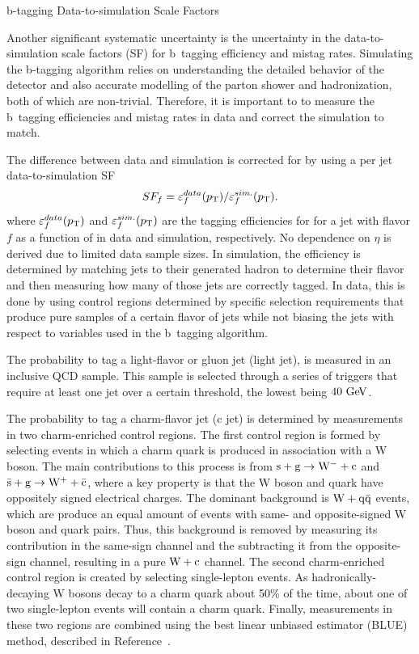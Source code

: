 \begin{section}{b-tagging Data-to-simulation Scale Factors}

Another significant systematic uncertainty is the uncertainty in the data-to-simulation scale factors (SF) for b~tagging efficiency and mistag rates.
Simulating the b-tagging algorithm relies on understanding the detailed behavior of the detector and also accurate modelling of the parton shower and hadronization, both of which are non-trivial.
Therefore, it is important to to measure the b~tagging efficiencies and mistag rates in data and correct the simulation to match.

The difference between data and simulation is corrected for by using a per jet data-to-simulation SF
\begin{align}
SF_{f} = \varepsilon^{data}_{f}(p_{\mathrm{T}})/\varepsilon^{sim.}_{f}(p_{\mathrm{T}}).
\end{align}
where $\varepsilon^{data}_{f}(p_{\mathrm{T}})$ and $\varepsilon^{sim.}_{f}(p_{\mathrm{T}})$ are the tagging efficiencies for for a jet with flavor $f$ as a function of \pT in data and simulation, respectively.
No dependence on $\eta$ is derived due to limited data sample sizes.
In simulation, the efficiency is determined by matching jets to their generated hadron to determine their flavor and then measuring how many of those jets are correctly tagged.
In data, this is done by using control regions determined by specific selection requirements that produce pure samples of a certain flavor of jets while not biasing the jets with respect to variables used in the b~tagging algorithm.

The probability to tag a light-flavor or gluon jet (light jet), is measured in an inclusive QCD sample.
This sample is selected through a series of triggers that require at least one jet over a certain \pT threshold, the lowest being $40~\mathrm{Ge\kern -0.1em V}$.

The probability to tag a charm-flavor jet (c jet) is determined by measurements in two charm-enriched control regions.
The first control region is formed by selecting events in which a charm quark is produced in association with a W boson.
The main contributions to this process is from $\mathrm{s} + \mathrm{g} \to \mathrm{W^{-}} + \mathrm{c}$ and $\mathrm{\bar{s}} + \mathrm{g} \to \mathrm{W^{+}} + \mathrm{\bar{c}}$, where a key property is that the W boson and quark have oppositely signed electrical charges.
The dominant background is $\mathrm{W} + \mathrm{q\bar{q}}$ events, which are produce an equal amount of events with same- and opposite-signed W boson and quark pairs.
Thus, this background is removed by measuring its contribution in the same-sign channel and the subtracting it from the opposite-sign channel, resulting in a pure $\mathrm{W} + \mathrm{c}$ channel.
The second charm-enriched control region is created by selecting single-lepton \ttbar events.
As hadronically-decaying W bosons decay to a charm quark about 50\% of the time, about one of two single-lepton \ttbar events will contain a charm quark.
Finally, measurements in these two regions are combined using the best linear unbiased estimator (BLUE) method, described in Reference~\cite{LYONS1988110}.


\end{section}
